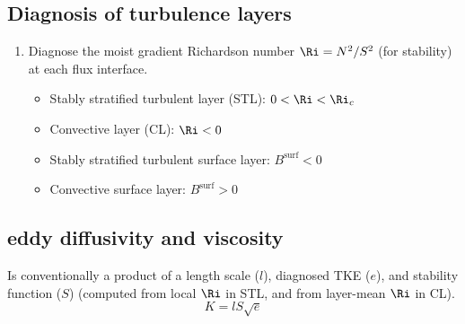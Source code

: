 \subsection{Diagnosis of turbulence layers}
%
\begin{enumerate}
   \item Diagnose the moist gradient Richardson number $\Ri = N^2/S^2$ (for stability) at each flux interface.
   \begin{itemize}
      \item Stably stratified turbulent layer (STL): $0<\Ri<\Ri_c$
      \item Convective layer (CL): $\Ri<0$
      \item Stably stratified turbulent surface layer: $B^{\text{surf}}<0$
      \item Convective surface layer: $B^{\text{surf}}>0$
   \end{itemize}
\end{enumerate}
%
%
\subsection{eddy diffusivity and viscosity}
Is conventionally a product of a length scale ($l$), diagnosed TKE ($e$), and stability function
($S$) (computed from local $\Ri$ in STL, and from layer-mean $\Ri$ in CL).
%
\begin{equation}
   K = l S \sqrt{e}
\end{equation}
%
